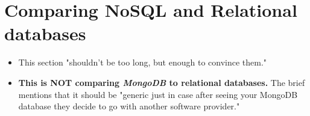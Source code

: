 \chapter{Comparing NoSQL and Relational databases} 
\begin{itemize}
    \item This section "shouldn't be too long, but enough to convince them."
    \item \textbf{This is NOT comparing \textit{MongoDB} to relational databases.} The brief 
    mentions that it should be "generic just in case after seeing your MongoDB database they decide to go with another software provider."
\end{itemize}